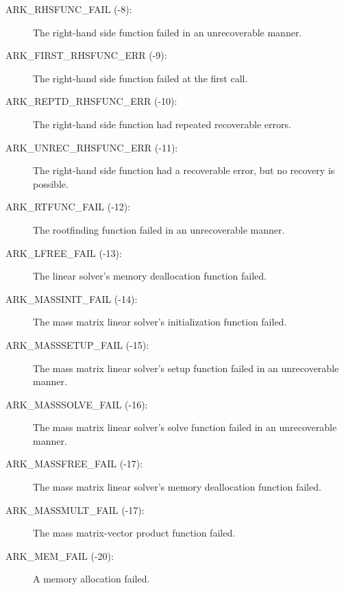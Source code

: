 \documentclass[letterpaper,10pt,english]{sphinxmanual}
\begin{document}
\begin{description}
\item[{ARK\_RHSFUNC\_FAIL  (-8):}] \leavevmode
The right-hand side function failed in an
unrecoverable manner.

\item[{ARK\_FIRST\_RHSFUNC\_ERR  (-9):}] \leavevmode
The right-hand side function failed
at the first call.

\item[{ARK\_REPTD\_RHSFUNC\_ERR  (-10):}] \leavevmode
The right-hand side function had
repeated recoverable errors.

\item[{ARK\_UNREC\_RHSFUNC\_ERR  (-11):}] \leavevmode
The right-hand side function had a
recoverable error, but no recovery is possible.

\item[{ARK\_RTFUNC\_FAIL  (-12):}] \leavevmode
The rootfinding function failed in an
unrecoverable manner.

\item[{ARK\_LFREE\_FAIL  (-13):}] \leavevmode
The linear solver's memory deallocation function failed.

\item[{ARK\_MASSINIT\_FAIL  (-14):}] \leavevmode
The mass matrix linear solver's initialization function failed.

\item[{ARK\_MASSSETUP\_FAIL  (-15):}] \leavevmode
The mass matrix linear solver's setup function failed in
an unrecoverable manner.

\item[{ARK\_MASSSOLVE\_FAIL  (-16):}] \leavevmode
The mass matrix linear solver's solve function failed in
an unrecoverable manner.

\item[{ARK\_MASSFREE\_FAIL  (-17):}] \leavevmode
The mass matrix linear solver's memory deallocation function failed.

\item[{ARK\_MASSMULT\_FAIL  (-17):}] \leavevmode
The mass matrix-vector product function failed.

\item[{ARK\_MEM\_FAIL  (-20):}] \leavevmode
A memory allocation failed.


\end{description}
\end{document}
